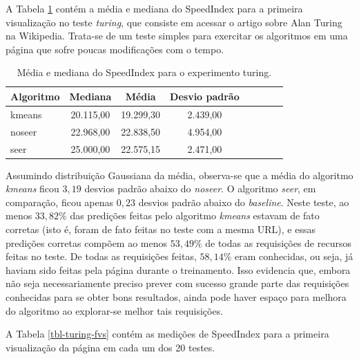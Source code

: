 \documentclass[10pt,twocolumn,letterpaper]{article}
\begin{document}
A Tabela \ref{tbl-turing} contém a média e mediana do SpeedIndex para a primeira visualização no teste \emph{turing}, que consiste em acessar o artigo sobre Alan Turing na Wikipedia. Trata-se de um teste simples para exercitar os algoritmos em uma página que sofre poucas modificações com o tempo.

\begin{table}
\begin{center}
\begin{tabular}{l*{6}{c}r}
\hline
Algoritmo & Mediana & Média & Desvio padrão \\
\hline
kmeans & 20.115,00 & 19.299,30  & 2.439,00 \\
noseer & 22.968,00 & 22.838,50 & 4.954,00 \\
seer & 25.000,00 & 22.575,15 & 2.471,00 \\
\hline
\end{tabular}
\end{center}
\caption{Média e mediana do SpeedIndex para o experimento turing.}
\label{tbl-turing}
\end{table}

Assumindo distribuição Gaussiana da média, observa-se que a média do algoritmo \emph{kmeans} ficou $3,19$ desvios padrão abaixo do \emph{noseer}. O algoritmo \emph{seer}, em comparação, ficou apenas $0,23$ desvios padrão abaixo do \emph{baseline}. Neste teste, ao menos $33,82 \%$ das predições feitas pelo algoritmo \emph{kmeans} estavam de fato corretas (isto é, foram de fato feitas no teste com a mesma URL), e essas predições corretas compõem ao menos $53,49 \%$ de todas as requisições de recursos feitas no teste. De todas as requisições feitas, $58,14 \%$ eram conhecidas, ou seja, já haviam sido feitas pela página durante o treinamento. Isso evidencia que, embora não seja necessariamente preciso prever com sucesso grande parte das requisições conhecidas para se obter bons resultados, ainda pode haver espaço para melhora do algoritmo ao explorar-se melhor tais requisições.

A Tabela \ref{tbl-turing-fvs} contém as medições de SpeedIndex para a primeira visualização da página em cada um dos 20 testes.
\end{document}

